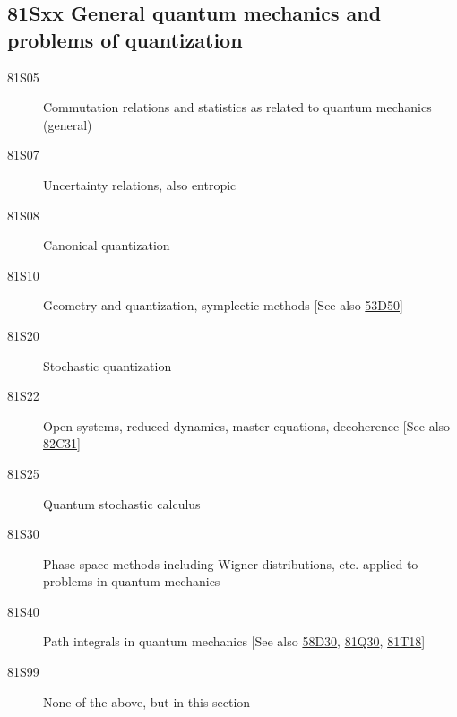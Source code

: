 \documentclass[letterpaper]{article}
\begin{document}
\subsection*{81Sxx  General quantum mechanics and problems of quantization }\label{81Sxx}
\begin{description}  
\item [81S05]\label{81S05} Commutation relations and statistics as related to quantum mechanics (general)
\item [81S07]\label{81S07} Uncertainty relations, also entropic
\item [81S08]\label{81S08} Canonical quantization
\item [81S10]\label{81S10} Geometry and quantization, symplectic methods [See also \hyperref[53D50]{53D50}]
\item [81S20]\label{81S20} Stochastic quantization
\item [81S22]\label{81S22} Open systems, reduced dynamics, master equations, decoherence [See also \hyperref[82C31]{82C31}]
\item [81S25]\label{81S25} Quantum stochastic calculus
\item [81S30]\label{81S30} Phase-space methods including Wigner distributions, etc. applied to problems in quantum mechanics
\item [81S40]\label{81S40} Path integrals in quantum mechanics [See also \hyperref[58D30]{58D30}, \hyperref[81Q30]{81Q30}, \hyperref[81T18]{81T18}]
\item [81S99]\label{81S99} None of the above, but in this section
\end{description}
\end{document}
